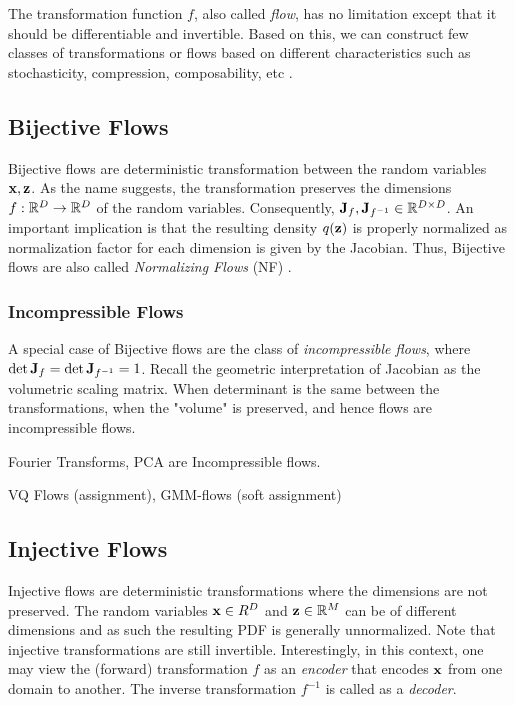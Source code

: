 \documentclass[a4paper, 11pt]{article}
\begin{document}
The transformation function $f$, also called \emph{flow}, has no limitation except that it should be differentiable and invertible. Based on this, we can construct few classes of transformations or flows based on different characteristics such as stochasticity, compression, composability, etc \citep{kothe2023review}.


\subsection{Bijective Flows}
Bijective flows are deterministic transformation between the random variables $\mbox{$\mbox{$\mathbf{x}$}$}, \mbox{$\mbox{$\mathbf{z}$}$}$. As the name suggests, the transformation preserves the dimensions $f: \mathbb{R}^D \to \mathbb{R}^D$ of the random variables. Consequently, $\mbox{$\mbox{$\mathbf{J}$}$}_{f}, \mbox{$\mbox{$\mathbf{J}$}$}_{f^{-1}} \in \mathbb{R}^{D \times D}$. An important implication is that the resulting density $q(\mbox{$\mbox{$\mathbf{z}$}$})$ is properly normalized as normalization factor for each dimension is given by the Jacobian. Thus, Bijective flows are also called \emph{Normalizing Flows} (NF) \citep{papamakarios2021normalizing}. 


\subsubsection{Incompressible Flows}
A special case of Bijective flows are the class of \emph{incompressible flows}, where $\det \mbox{$\mbox{$\mathbf{J}$}$}_f = \det \mbox{$\mbox{$\mathbf{J}$}$}_{f^{-1}} = 1$. Recall the geometric interpretation of Jacobian as the volumetric scaling matrix. When determinant is the same between the transformations, when the "volume" is preserved, and hence flows are incompressible flows. 

Fourier Transforms, PCA are Incompressible flows. 

VQ Flows (assignment), GMM-flows (soft assignment)


\subsection{Injective Flows}
Injective flows are deterministic transformations where the dimensions are not preserved. The random variables $\mbox{$\mbox{$\mathbf{x}$}$} \in R^D$ and $\mbox{$\mbox{$\mathbf{z}$}$} \in \mathbb{R}^M$ can be of different dimensions and as such the resulting PDF is generally unnormalized. Note that injective transformations are still invertible. Interestingly, in this context, one may view the (forward) transformation $f$ as an \emph{encoder} that encodes $\mbox{$\mbox{$\mathbf{x}$}$}$ from one domain to another. The inverse transformation $f^{-1}$ is called as a \emph{decoder}.
\end{document}
